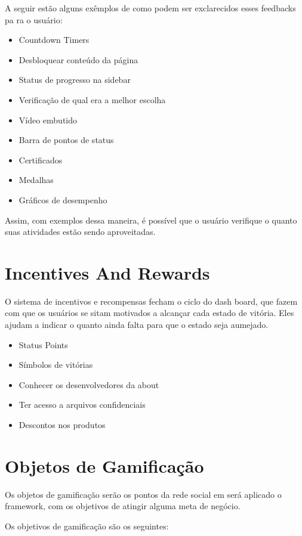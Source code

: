 A seguir estão alguns exêmplos de como podem ser exclarecidos esses feedbacks pa ra o usuário:

\begin{itemize}
    \item Countdown Timers
    \item Desbloquear conteúdo da página
    \item Status de progresso na sidebar
    \item Verificação de qual era a melhor escolha
    \item Vídeo embutido
    \item Barra de pontos de status
    \item Certificados
    \item Medalhas
    \item Gráficos de desempenho
\end{itemize}

Assim, com exemplos dessa maneira, é possível que o usuário verifique o quanto suas atividades estão
sendo aproveitadas.

\section{Incentives And Rewards}
\label{sub:incentives_and_rewards}
O sistema de incentivos e recompensas fecham o ciclo do dash board, que fazem com que 
os usuários se sitam motivados a alcançar cada estado de vitória. Eles ajudam a 
indicar
o quanto ainda falta para que o estado seja aumejado.

\begin{itemize}
    \item Status Points
    \item Símbolos de vitórias
    \item Conhecer os desenvolvedores da about
    \item Ter acesso a arquivos confidenciais
    \item Descontos nos produtos
\end{itemize}

\section{Objetos de Gamificação}
\label{sec:objetodegamificacao}
Os objetos de gamificação serão os pontos da rede social em será aplicado o framework,
com os objetivos de atingir alguma meta de negócio.

Os objetivos de gamificação são os seguintes:

